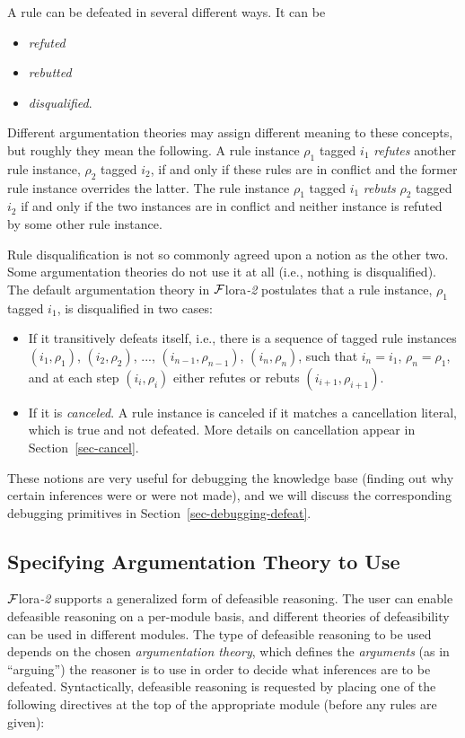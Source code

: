 \documentclass[11pt]{article}
\newcommand{\FLORA}{{\mbox{\sc ${\cal F}${lora}\rm\emph{-2}}}\xspace}
\begin{document}
A rule can be defeated in several different ways. It can be
\begin{itemize}
\item  \emph{refuted}
\item  \emph{rebutted} 
\item  \emph{disqualified}. 
\end{itemize}
Different argumentation theories may assign different meaning to these
concepts, but roughly they mean the following. A rule instance $\rho_1$
tagged $i_1$ \emph{refutes} another rule instance, $\rho_2$ tagged $i_2$, 
if and only if these rules are in conflict and the former rule instance
overrides the latter. The rule instance $\rho_1$
tagged $i_1$ \emph{rebuts} $\rho_2$ tagged $i_2$ if and only if the two
instances are in conflict and neither instance is refuted by some other
rule instance.

Rule disqualification is not so commonly agreed upon a notion as the other
two.  Some argumentation theories do not use it at all (i.e., nothing is
disqualified).  The default argumentation theory in \FLORA postulates that a
rule instance, $\rho_1$ tagged $i_1$, is disqualified in two cases:
\begin{itemize}
\item If it transitively defeats itself, i.e., there is a sequence of
  tagged rule instances $(i_1,\rho_1)$, $(i_2,\rho_2)$, ...,
  $(i_{n-1},\rho_{n-1})$, $(i_n,\rho_n)$, such that $i_n=i_1$,
  $\rho_n=\rho_1$, and at each step $(i_i,\rho_i)$ either refutes or rebuts
  $(i_{i+1},\rho_{i+1})$.
\item If it is \emph{canceled}. A rule instance is canceled if it matches a
  cancellation literal, which is true and not defeated. More details on
  cancellation appear in Section~\ref{sec-cancel}.
\end{itemize}

These notions are very useful for debugging the knowledge base (finding out why
certain inferences were or were not made), and we will discuss the
corresponding debugging primitives in Section~\ref{sec-debugging-defeat}.


\subsection{Specifying Argumentation Theory to Use}

\FLORA supports a generalized form of defeasible reasoning.
The user can enable defeasible reasoning on a per-module basis, and
different theories of defeasibility can be used in different modules.
The type of defeasible reasoning to be used depends on the chosen
\emph{argumentation theory}, which defines the \emph{arguments} (as in
``arguing'') the reasoner is to use in order to decide what inferences
are to be defeated. Syntactically, defeasible reasoning is requested
by placing one of the following directives at the top of the
appropriate module (before any rules are given):
\end{document}
